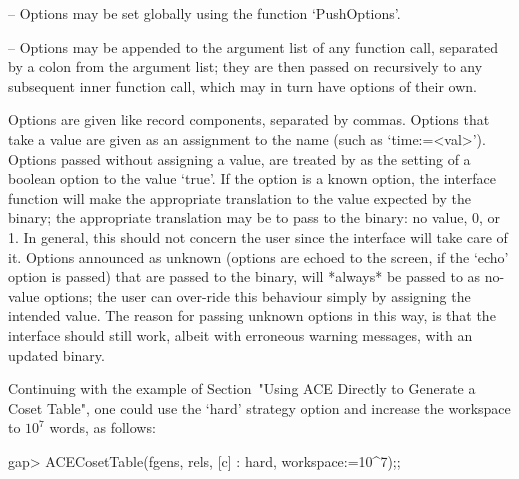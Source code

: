 \beginlist

\item{--} Options may be set globally using the function `PushOptions'.

\item{--} Options may be appended to the argument list of any function
call,  separated by a  colon from  the argument  list;  they  are then
passed on recursively to any subsequent inner function call, which may
in turn have options of their own.


\endlist

Options are given like record components, separated by commas. Options
that take a value are given as an assignment  to  the  name  (such  as
`time:=<val>'). Options passed without assigning a value, are  treated
by {\GAP} as the setting of a boolean option to the value  `true'.  If
the option is a known {\ACE} option,  the  {\ACE}  interface  function
will make the appropriate translation to the  value  expected  by  the
{\ACE} binary; the appropriate translation  may  be  to  pass  to  the
binary: no value, 0, or 1. In general, this  should  not  concern  the
user since  the  {\ACE}  interface  will  take  care  of  it.  Options
announced as unknown (options are echoed to the screen, if the  `echo'
option is passed) that are passed to the {\ACE} binary, will  *always*
be passed to {\ACE} as no-value options; the user can  over-ride  this
behaviour simply by assigning  the  intended  value.  The  reason  for
passing unknown options in this way,  is  that  the  {\ACE}  interface
should still work, albeit with erroneous  warning  messages,  with  an
updated {\ACE} binary.

Continuing with the example of Section~"Using ACE Directly to Generate
a Coset Table", one could use the `hard' strategy option and  increase
the workspace to $10^7$ words, as follows:

\begintt
gap> ACECosetTable(fgens, rels, [c] : hard, workspace:=10^7);;
\endtt

